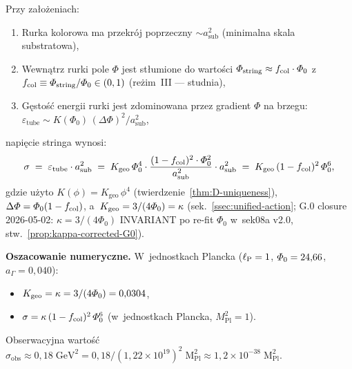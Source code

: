 \begin{proposition}%
\label{prop:sigma-estimate}
Przy założeniach:
\begin{enumerate}[nosep]
    \item[(S1)] Rurka kolorowa ma przekrój poprzeczny $\sim a_{\mathrm{sub}}^2$
          (minimalna skala substratowa),
    \item[(S2)] Wewnątrz rurki pole $\Phi$ jest stłumione do wartości
          $\varPhi_{\mathrm{string}} \approx f_{\mathrm{col}} \cdot \varPhi_0$
          z~$f_{\mathrm{col}} \equiv \varPhi_{\mathrm{string}}/\varPhi_0
          \in (0,1)$ (reżim~III --- studnia),
    \item[(S3)] Gęstość energii rurki jest zdominowana przez gradient
          $\Phi$ na brzegu: $\varepsilon_{\mathrm{tube}}
          \sim K(\Phi_0)\,(\Delta\Phi)^2 / a_{\mathrm{sub}}^2$,
\end{enumerate}
napięcie stringa wynosi:
\begin{equation}\label{eq:sigma-from-TGP}
    \sigma \;=\; \varepsilon_{\mathrm{tube}} \cdot a_{\mathrm{sub}}^2
    \;=\; K_{\mathrm{geo}}\,\varPhi_0^4 \cdot
    \frac{(1 - f_{\mathrm{col}})^2 \cdot \varPhi_0^2}{a_{\mathrm{sub}}^2}
    \cdot a_{\mathrm{sub}}^2
    \;=\; K_{\mathrm{geo}}\,(1 - f_{\mathrm{col}})^2\,\varPhi_0^6,
\end{equation}
gdzie użyto $K(\phi) = K_{\mathrm{geo}}\,\phi^4$
(twierdzenie~\ref{thm:D-uniqueness}),
$\Delta\varPhi = \varPhi_0(1 - f_{\mathrm{col}})$,
a~$K_{\mathrm{geo}} = 3/(4\varPhi_0) = \kappa$
(sek.~\ref{ssec:unified-action}; G.0 closure 2026-05-02:
$\kappa = 3/(4\Phi_0)$ INVARIANT po re-fit $\Phi_0$ w~sek08a v2.0,
stw.~\ref{prop:kappa-corrected-G0}).

\noindent\textbf{Oszacowanie numeryczne.}
W~jednostkach Plancka ($\ell_{\mathrm{P}} = 1$, $\varPhi_0 = 24{,}66$,
$a_{\Gamma} = 0{,}040$):
\begin{itemize}[nosep]
    \item $K_{\mathrm{geo}} = \kappa = 3/(4\varPhi_0) = 0{,}0304$,
    \item $\sigma = \kappa\,(1-f_{\mathrm{col}})^2\,\varPhi_0^6$
          (w~jednostkach Plancka, $M_{\mathrm{Pl}}^2 = 1$).
\end{itemize}
Obserwacyjna wartość $\sigma_{\mathrm{obs}} \approx 0{,}18\;\mathrm{GeV}^2
= 0{,}18/(1{,}22\times 10^{19})^2\;\mathrm{M_{Pl}^2}
\approx 1{,}2 \times 10^{-38}\;\mathrm{M_{Pl}^2}$.


\end{proposition}
